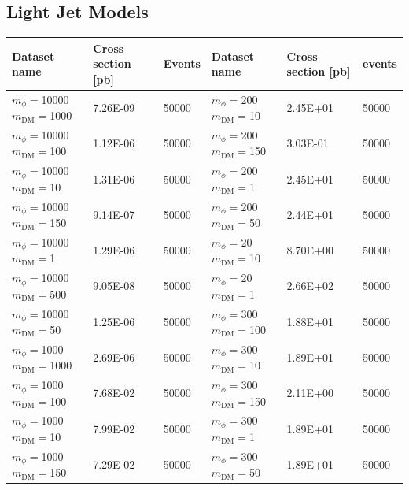 \subsection{Light Jet Models}

\begin{table}[]
\centering
\small
\begin{tabular}{lll||lll}
\hline
Dataset name        & Cross section [pb]  & Events    & Dataset name  & Cross section [pb]  & events           \\\hline
$m_\phi=$10000 $m_\textrm{DM}=$1000 & 7.26E-09     & 50000                  &  $m_\phi=$200 $m_\textrm{DM}=$10     & 2.45E+01     & 50000                  \\ 
$m_\phi=$10000 $m_\textrm{DM}=$100  & 1.12E-06     & 50000                  &  $m_\phi=$200 $m_\textrm{DM}=$150    & 3.03E-01     & 50000                  \\ 
$m_\phi=$10000 $m_\textrm{DM}=$10   & 1.31E-06     & 50000                  &  $m_\phi=$200 $m_\textrm{DM}=$1      & 2.45E+01     & 50000                  \\ 
$m_\phi=$10000 $m_\textrm{DM}=$150  & 9.14E-07     & 50000                  &  $m_\phi=$200 $m_\textrm{DM}=$50     & 2.44E+01     & 50000                  \\ 
$m_\phi=$10000 $m_\textrm{DM}=$1    & 1.29E-06     & 50000                  &  $m_\phi=$20 $m_\textrm{DM}=$10      & 8.70E+00     & 50000                  \\ 
$m_\phi=$10000 $m_\textrm{DM}=$500  & 9.05E-08     & 50000                  &  $m_\phi=$20 $m_\textrm{DM}=$1       & 2.66E+02     & 50000                  \\ 
$m_\phi=$10000 $m_\textrm{DM}=$50   & 1.25E-06     & 50000                  &  $m_\phi=$300 $m_\textrm{DM}=$100    & 1.88E+01     & 50000                  \\ 
$m_\phi=$1000 $m_\textrm{DM}=$1000  & 2.69E-06     & 50000                  &  $m_\phi=$300 $m_\textrm{DM}=$10     & 1.89E+01     & 50000                  \\ 
$m_\phi=$1000 $m_\textrm{DM}=$100   & 7.68E-02     & 50000                  &  $m_\phi=$300 $m_\textrm{DM}=$150    & 2.11E+00     & 50000                  \\ 
$m_\phi=$1000 $m_\textrm{DM}=$10    & 7.99E-02     & 50000                  &  $m_\phi=$300 $m_\textrm{DM}=$1      & 1.89E+01     & 50000                  \\ 
$m_\phi=$1000 $m_\textrm{DM}=$150   & 7.29E-02     & 50000                  &  $m_\phi=$300 $m_\textrm{DM}=$50     & 1.89E+01     & 50000                  \\ 

\end{tabular}
\end{table}
